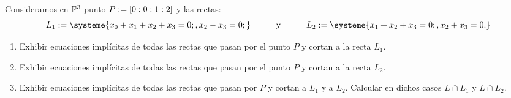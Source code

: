 \documentclass{homeworg}
\begin{document}
\exercise
Consideramos en $\P^{3}$ punto $P:=\qty[0:0:1:2]$ y las rectas:
\begin{equation*}
L_{1}:=\systeme{x_{0}+x_{1}+x_{2}+x_{3}=0;, 
        x_{2}-x_{3}=0;}\hmid \text{y}\hmid L_{2}:=\systeme{x_{1}+x_{2}+x_{3}=0;,
        x_{2}+x_{3}=0.}
\end{equation*}

\begin{enumerate}[label=\roman*)]
\item Exhibir ecuaciones implícitas de todas las rectas que pasan por el punto $P$ y cortan a la recta $L_{1}$.
\item Exhibir ecuaciones implícitas de todas las rectas que pasan por el punto $P$ y cortan a la recta $L_{2}$.
\item Exhibir ecuaciones implícitas de todas las rectas que pasan por $P$ y cortan a $L_{1}$ y a $L_{2}$. Calcular en dichos casos $L\cap L_{1}$ y $L\cap L_{2}$.
\end{enumerate}
\end{document}
